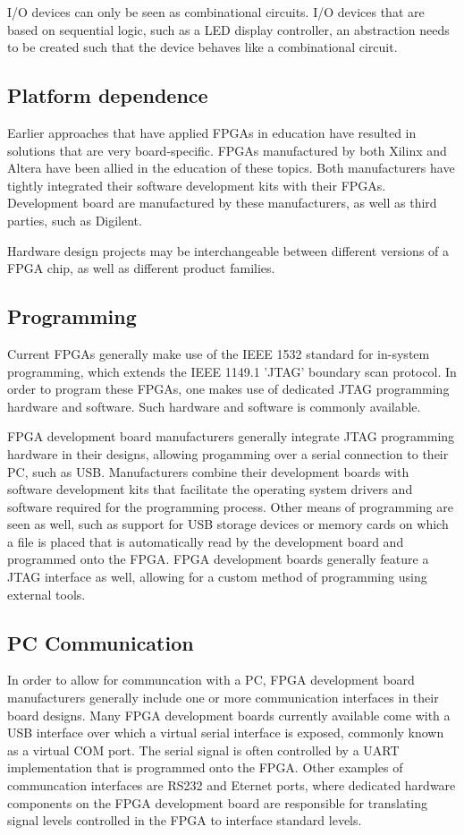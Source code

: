 \documentclass[openright]{template/uva-bachelor-thesis}
\begin{document}
I/O devices can only be seen as combinational circuits. I/O devices that are based on sequential logic, such as a LED display controller, an abstraction needs to be created such that the device behaves like a combinational circuit. 

\subsection{Platform dependence}
Earlier approaches that have applied FPGAs in education have resulted in solutions that are very board-specific. FPGAs manufactured by both Xilinx and Altera have been allied in the education of these topics. Both manufacturers have tightly integrated their software development kits with their FPGAs. Development board are manufactured by these manufacturers, as well as third parties, such as Digilent. 

Hardware design projects may be interchangeable between different versions of a FPGA chip, as well as different product families.

\subsection{Programming}
Current FPGAs generally make use of the IEEE 1532 standard for in-system programming, which extends the IEEE 1149.1 'JTAG' boundary scan protocol. In order to program these FPGAs, one makes use of dedicated JTAG programming hardware and software. Such hardware and software is commonly available.  

FPGA development board manufacturers generally integrate JTAG programming hardware in their designs, allowing progamming over a serial connection to their PC, such as USB. Manufacturers combine their development boards with software development kits that facilitate the operating system drivers and software required for the programming process. Other means of programming are seen as well, such as support for USB storage devices or memory cards on which a file is placed that is automatically read by the development board and programmed onto the FPGA. FPGA development boards generally feature a JTAG interface as well, allowing for a custom method of programming using external tools. 

\subsection{PC Communication}
In order to allow for communcation with a PC, FPGA development board manufacturers generally include one or more communication interfaces in their board designs. Many FPGA development boards currently available come with a USB interface over which a virtual serial interface is exposed, commonly known as a virtual COM port. The serial signal is often controlled by a UART implementation that is programmed onto the FPGA. Other examples of communcation interfaces are RS232 and Eternet ports, where dedicated hardware components on the FPGA development board are responsible for translating signal levels controlled in the FPGA to interface standard levels. 
\end{document}
